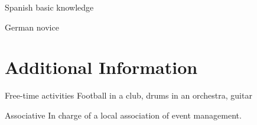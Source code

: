 \documentclass[10pt,a4paper]{moderncv}
\begin{document}
\cvlanguage
	{Spanish}
	{basic knowledge}
	{}

\cvlanguage
	{German}
	{novice}
	{}


\section{Additional Information}

\cvline
	{Free-time activities}
	{Football in a club, drums in an orchestra, guitar}

\cvline
	{Associative}
	{In charge of a local association of event management.}

\end{document}
